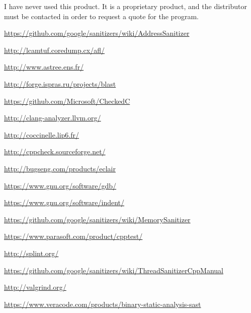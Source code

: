 \documentclass[12pt]{article}
\begin{document}
I have never used this product. It is a proprietary product, and the
distributor must be contacted in order to request a quote for the program.
\cite{sast}
\newpage

\begin{thebibliography}{9}


    \url{https://github.com/google/sanitizers/wiki/AddressSanitizer}

    \url{http://lcamtuf.coredump.cx/afl/}

    \url{http://www.astree.ens.fr/}

    \url{http://forge.ispras.ru/projects/blast}

    \url{https://github.com/Microsoft/CheckedC}

    \url{http://clang-analyzer.llvm.org/}

    \url{http://coccinelle.lip6.fr/}

    \url{http://cppcheck.sourceforge.net/}

    \url{http://bugseng.com/products/eclair}

    \url{https://www.gnu.org/software/gdb/}

    \url{https://www.gnu.org/software/indent/}

    \url{https://github.com/google/sanitizers/wiki/MemorySanitizer}

    \url{https://www.parasoft.com/product/cpptest/}

    \url{http://splint.org/}

    \url{https://github.com/google/sanitizers/wiki/ThreadSanitizerCppManual}

    \url{http://valgrind.org/}

    \url{https://www.veracode.com/products/binary-static-analysis-sast}

\end{thebibliography}
\end{document}

